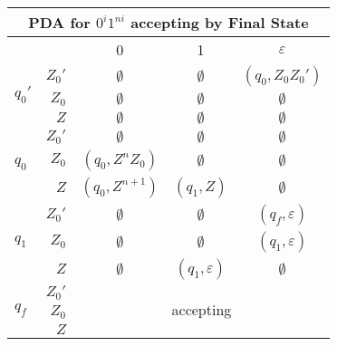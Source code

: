 \begin{center}\begin{tabular}{l r c c c}
    \multicolumn{5}{c}{PDA for \(0^i 1^{ni}\) accepting by Final State}\\\bottomrule
    & & 0 & 1 & \(\varepsilon \) \\\cmidrule{3-5}
    \multirow{3}{*}{\(q_0'\)} & \(Z_0'\) & \(\emptyset \) & \(\emptyset \) & \((q_0, Z_0 Z_0')\) \\
    & \(Z_0\) & \(\emptyset \) & \(\emptyset \) & \(\emptyset \) \\
    & \(Z\) & \(\emptyset \) & \(\emptyset \) & \(\emptyset \) \\\midrule
    \multirow{3}{*}{\(q_0\)}  & \(Z_0'\) & \(\emptyset \) & \(\emptyset \) & \(\emptyset \) \\
    & \(Z_0\) & \((q_0, Z^n Z_0)\) & \(\emptyset \) & \(\emptyset \) \\
    & \(Z\) & \((q_0, Z^{n+1})\)  & \((q_1, Z) \) & \(\emptyset \) \\\midrule
    \multirow{3}{*}{\(q_1\)} & \(Z_0'\) & \(\emptyset \) & \(\emptyset \) & \((q_f, \varepsilon)\) \\
    & \(Z_0\) & \(\emptyset \) & \(\emptyset \) & \((q_1, \varepsilon)\) \\
    & \(Z\) & \(\emptyset \) & \((q_1, \varepsilon)\) & \(\emptyset \) \\\midrule
    \multirow{3}{*}{\(q_f\)} & \(Z_0'\) &\multicolumn{3}{c}{\multirow{3}{*}{accepting}} \\
    & \(Z_0\) \\
    & \(Z\)
\end{tabular}\end{center}


